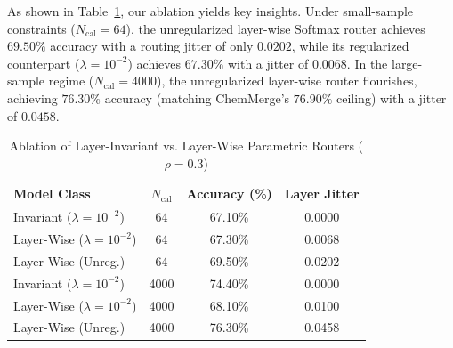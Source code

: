 As shown in Table~\ref{tab:layerwise_ablation}, our ablation yields key insights. Under small-sample constraints ($N_{\text{cal}} = 64$), the unregularized layer-wise Softmax router achieves $69.50\%$ accuracy with a routing jitter of only $0.0202$, while its regularized counterpart ($\lambda=10^{-2}$) achieves $67.30\%$ with a jitter of $0.0068$. In the large-sample regime ($N_{\text{cal}} = 4000$), the unregularized layer-wise router flourishes, achieving $76.30\%$ accuracy (matching ChemMerge's $76.90\%$ ceiling) with a jitter of $0.0458$.

\begin{table}[ht]
\caption{Ablation of Layer-Invariant vs. Layer-Wise Parametric Routers ($\rho=0.3$)}
\label{tab:layerwise_ablation}
\centering
\begin{footnotesize}
\setlength{\tabcolsep}{2.2pt}
\begin{tabular}{lccc}
\toprule
\textbf{Model Class} & \textbf{$N_{\text{cal}}$} & \textbf{Accuracy (\%)} & \textbf{Layer Jitter} \\
\midrule
Invariant ($\lambda=10^{-2}$) & 64 & 67.10\% & 0.0000 \\
Layer-Wise ($\lambda=10^{-2}$) & 64 & 67.30\% & 0.0068 \\
Layer-Wise (Unreg.) & 64 & 69.50\% & 0.0202 \\
\midrule
Invariant ($\lambda=10^{-2}$) & 4000 & 74.40\% & 0.0000 \\
Layer-Wise ($\lambda=10^{-2}$) & 4000 & 68.10\% & 0.0100 \\
Layer-Wise (Unreg.) & 4000 & 76.30\% & 0.0458 \\
\bottomrule
\end{tabular}
\end{footnotesize}
\end{table}

